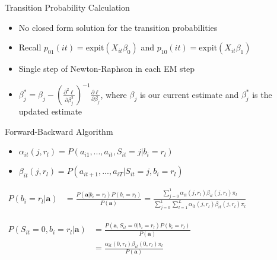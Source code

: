 \documentclass{beamer}
\begin{document}


\begin{frame}{Transition Probability Calculation}
    \begin{itemize}
        \item No closed form solution for the transition probabilities
        \item Recall $p_{01}(it) = \text{expit}(X_{it}\beta_0)$ and $p_{10}(it) = \text{expit}(X_{it}\beta_1)$
        \item Single step of Newton-Raphson in each EM step
        \item $\beta_{j}^* = \beta_{j} - (\frac{\partial^2\ell}{\partial \beta_{j}^2})^{-1} \frac{\partial\ell}{\partial \beta_{j}}$, where $\beta_{j}$ is our current estimate and $\beta_{j}^*$ is the updated estimate
    \end{itemize}
    
\end{frame}


\begin{frame}{Forward-Backward Algorithm}
\begin{itemize}
    \item $\alpha_{it}(j,r_l) = P(a_{i1}, ..., a_{it}, S_{it} = j | b_i=r_l)$
    \smallskip
    \item $\beta_{it}(j,r_l) =  P(a_{it+1}, ..., a_{iT} | S_{it} = j,b_i=r_l)$
\end{itemize} 

\bigskip
\bigskip

$\begin{aligned}
    P(b_{i}=r_l|\textbf{a}) & = \frac{P(\textbf{a}|b_{i}=r_l)P(b_{i}=r_l)}{P(\textbf{a})} = 
    \frac{\sum_{j=0}^1 \alpha_{it}(j,r_l)\beta_{it}(j,r_l)\pi_l }
    {\sum_{j=0}^1\sum_{l=1}^L \alpha_{it}(j,r_l)\beta_{it}(j,r_l)\pi_l } 
\end{aligned}$

\bigskip
\bigskip

$\begin{aligned}
    P(S_{it}=0,b_{i}=r_l|\textbf{a}) & = \frac{P(\textbf{a},S_{it}=0|b_{i}=r_l)P(b_{i}=r_l)}{P(\textbf{a})} \\
    & = \frac{\alpha_{it}(0,r_l)\beta_{it}(0,r_l)\pi_l }
    {P(\textbf{a})}
\end{aligned}$

\end{frame}
\end{document}
